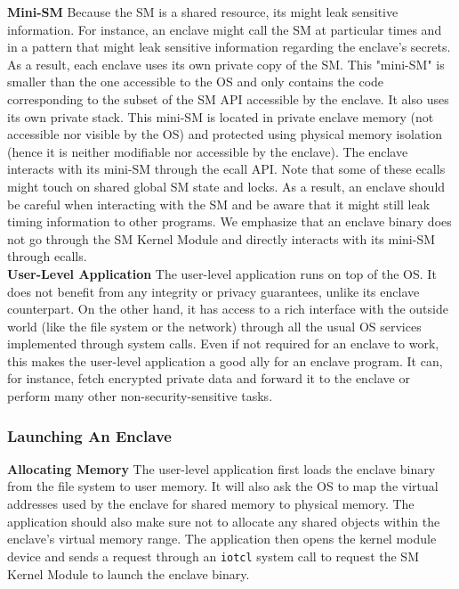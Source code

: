 \noindent\textbf{Mini-SM}
Because the SM is a shared resource, its might leak sensitive information. For instance, an enclave might call the SM at particular times and in a pattern that might leak sensitive information regarding the enclave's secrets.
As a result, each enclave uses its own private copy of the SM.
This "mini-SM" is smaller than the one accessible to the OS and only contains the code corresponding to the subset of the SM API accessible by the enclave.
It also uses its own private stack.
This mini-SM is located in private enclave memory (not accessible nor visible by the OS) and protected using physical memory isolation (hence it is neither modifiable nor accessible by the enclave).
The enclave interacts with its mini-SM through the ecall API.
Note that some of these ecalls might touch on shared global SM state and locks.
As a result, an enclave should be careful when interacting with the SM and be aware that it might still leak timing information to other programs.
We emphasize that an enclave binary does not go through the SM Kernel Module and directly interacts with its mini-SM through ecalls.
\\

\noindent\textbf{User-Level Application}
The user-level application runs on top of the OS.
It does not benefit from any integrity or privacy guarantees, unlike its enclave counterpart.
On the other hand, it has access to a rich interface with the outside world (like the file system or the network) through all the usual OS services implemented through system calls.
Even if not required for an enclave to work, this makes the user-level application a good ally for an enclave program.
It can, for instance, fetch encrypted private data and forward it to the enclave or perform many other non-security-sensitive tasks.

\subsubsection{Launching An Enclave}
\label{app:launchingprocess}
\noindent\textbf{Allocating Memory}
The user-level application first loads the enclave binary from the file system to user memory.
It will also ask the OS to map the virtual addresses used by the enclave for shared memory to physical memory.
The application should also make sure not to allocate any shared objects within the enclave's virtual memory range.
The application then opens the kernel module device and sends a request through an \texttt{iotcl} system call to request the SM Kernel Module to launch the enclave binary.
\\

